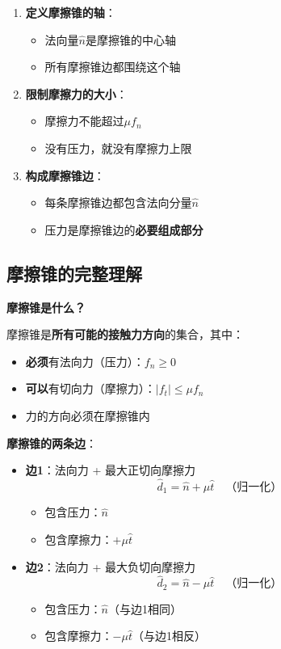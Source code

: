 \documentclass[12pt,a4paper]{article}
\begin{document}
\begin{enumerate}
\item \textbf{定义摩擦锥的轴}：
   \begin{itemize}
   \item 法向量$\hat{n}$是摩擦锥的中心轴
   \item 所有摩擦锥边都围绕这个轴
   \end{itemize}

\item \textbf{限制摩擦力的大小}：
   \begin{itemize}
   \item 摩擦力不能超过$\mu f_n$
   \item 没有压力，就没有摩擦力上限
   \end{itemize}

\item \textbf{构成摩擦锥边}：
   \begin{itemize}
   \item 每条摩擦锥边都包含法向分量$\hat{n}$
   \item 压力是摩擦锥边的\textbf{必要组成部分}
   \end{itemize}
\end{enumerate}

\subsection{摩擦锥的完整理解}

\textbf{摩擦锥是什么？}

摩擦锥是\textbf{所有可能的接触力方向}的集合，其中：
\begin{itemize}
\item \textbf{必须}有法向力（压力）：$f_n \geq 0$
\item \textbf{可以}有切向力（摩擦力）：$|f_t| \leq \mu f_n$
\item 力的方向必须在摩擦锥内
\end{itemize}

\textbf{摩擦锥的两条边}：

\begin{itemize}
\item \textbf{边1}：法向力 + 最大正切向摩擦力
   \begin{equation}
   \hat{d}_1 = \hat{n} + \mu \hat{t} \quad \text{（归一化）}
   \end{equation}
   \begin{itemize}
   \item 包含压力：$\hat{n}$
   \item 包含摩擦力：$+\mu \hat{t}$
   \end{itemize}

\item \textbf{边2}：法向力 + 最大负切向摩擦力
   \begin{equation}
   \hat{d}_2 = \hat{n} - \mu \hat{t} \quad \text{（归一化）}
   \end{equation}
   \begin{itemize}
   \item 包含压力：$\hat{n}$（与边1相同）
   \item 包含摩擦力：$-\mu \hat{t}$（与边1相反）
   \end{itemize}
\end{itemize}
\end{document}
